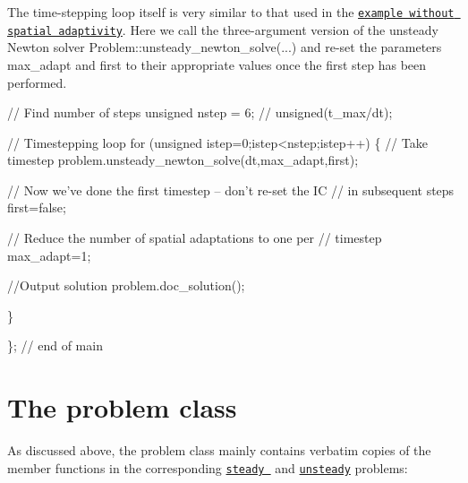 The time-\/stepping loop itself is very similar to that used in the \href{../../two_d_unsteady_heat/html/index.html}{\tt example without spatial adaptivity}. Here we call the three-\/argument version of the unsteady Newton solver {\ttfamily Problem\+::unsteady\+\_\+newton\+\_\+solve}(...) and re-\/set the parameters {\ttfamily max\+\_\+adapt} and {\ttfamily first} to their appropriate values once the first step has been performed.

 
\begin{DoxyCodeInclude}
 \textcolor{comment}{// Find number of steps}
 \textcolor{keywordtype}{unsigned} nstep = 6; \textcolor{comment}{// unsigned(t\_max/dt);}

 \textcolor{comment}{// Timestepping loop}
 \textcolor{keywordflow}{for} (\textcolor{keywordtype}{unsigned} istep=0;istep<nstep;istep++)
  \{
   \textcolor{comment}{// Take timestep }
   problem.unsteady\_newton\_solve(dt,max\_adapt,first);
   
   \textcolor{comment}{// Now we've done the first timestep -- don't re-set the IC}
   \textcolor{comment}{// in subsequent steps}
   first=\textcolor{keyword}{false};
   
   \textcolor{comment}{// Reduce the number of spatial adaptations to one per }
   \textcolor{comment}{// timestep}
   max\_adapt=1;
   
   \textcolor{comment}{//Output solution}
   problem.doc\_solution();

  \}
 

\}; \textcolor{comment}{// end of main}

\end{DoxyCodeInclude}




 

\hypertarget{index_problem}{}\section{The problem class}\label{index_problem}
As discussed above, the problem class mainly contains verbatim copies of the member functions in the corresponding \href{../../../poisson/two_d_poisson_flux_bc_adapt/html/index.html}{\tt steady } and \href{../../two_d_unsteady_heat/html/index.html}{\tt unsteady} problems\+:

